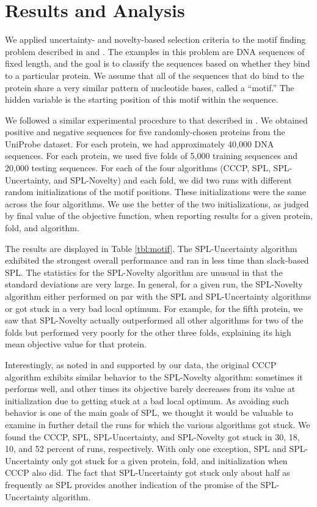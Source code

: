 \documentclass{article}
\begin{document}
\section{Results and Analysis}

We applied uncertainty- and novelty-based selection criteria to the motif finding problem described in \cite{SPL} and \cite{SSVM}. The examples in this problem are DNA sequences of fixed length, and the goal is to classify the sequences based on whether they bind to a particular protein. We assume that all of the sequences that do bind to the protein share a very similar pattern of nucleotide bases, called a ``motif.'' The hidden variable is the starting position of this motif within the sequence.

We followed a similar experimental procedure to that described in \cite{SPL}. We obtained positive and negative sequences for five randomly-chosen proteins from the UniProbe dataset. For each protein, we had approximately 40,000 DNA sequences. For each protein, we used five folds of 5,000 training sequences and 20,000 testing sequences. For each of the four algorithms (CCCP, SPL, SPL-Uncertainty, and SPL-Novelty) and each fold, we did two runs with different random initializations of the motif positions. These initializations were the same across the four algorithms. We use the better of the two initializations, as judged by final value of the objective function, when reporting results for a given protein, fold, and algorithm. 

The results are displayed in Table \ref{tbl:motif}. The SPL-Uncertainty algorithm exhibited the strongest overall performance and ran in less time than slack-based SPL. The statistics for the SPL-Novelty algorithm are unusual in that the standard deviations are very large. In general, for a given run, the SPL-Novelty algorithm either performed on par with the SPL and SPL-Uncertainty algorithms or got stuck in a very bad local optimum. For example, for the fifth protein, we saw that SPL-Novelty actually outperformed all other algorithms for two of the folds but performed very poorly for the other three folds, explaining its high mean objective value for that protein. 

Interestingly, as noted in \cite{SPL} and supported by our data, the original CCCP algorithm exhibits similar behavior to the SPL-Novelty algorithm: sometimes it performs well, and other times its objective barely decreases from its value at initialization due to getting stuck at a bad local optimum. As avoiding such behavior is one of the main goals of SPL, we thought it would be valuable to examine in further detail the runs for which the various algorithms got stuck. We found the CCCP, SPL, SPL-Uncertainty, and SPL-Novelty got stuck in 30, 18, 10, and 52 percent of runs, respectively. With only one exception, SPL and SPL-Uncertainty only got stuck for a given protein, fold, and initialization when CCCP also did. The fact that SPL-Uncertainty got stuck only about half as frequently as SPL provides another indication of the promise of the SPL-Uncertainty algorithm. 
\end{document}
